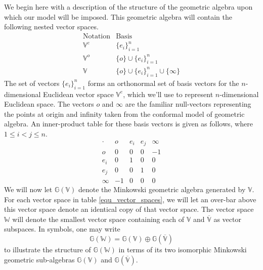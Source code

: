 \documentclass{birkjour}
\theoremstyle{definition}
\theoremstyle{remark}
\numberwithin{equation}{section}
\newcommand{\G}{\mathbb{G}}
\newcommand{\V}{\mathbb{V}}
\newcommand{\Vb}{\mathbb{\overline{V}}}
\newcommand{\W}{\mathbb{W}}
\newcommand{\nvao}{o}
\newcommand{\nvai}{\infty}
\begin{document}
We begin here with a description of the structure of the geometric algebra upon
which our model will be imposed.  This
geometric algebra will contain the following nested vector spaces.
\begin{equation}\label{equ_vector_spaces}
\begin{array}{ll}
\mbox{Notation} & \mbox{Basis} \\
\hline
\V^e & \{e_i\}_{i=1}^n \\
\V^o & \{\nvao\}\cup\{e_i\}_{i=1}^n \\
\V & \{\nvao\}\cup\{e_i\}_{i=1}^n\cup\{\nvai\}
\end{array}
\end{equation}
The set of vectors $\{e_i\}_{i=1}^n$ forms an orthonormal set of basis
vectors for the $n$-dimensional Euclidean vector space $\V^e$, which we'll
use to represent $n$-dimensional Euclidean space.
The vectors $\nvao$ and $\nvai$ are the familiar null-vectors representing the
points at origin and infinity taken from the conformal model of geometric algebra.
An inner-product table for these basis vectors is given as follows, where
$1\leq i<j\leq n$.
\begin{equation}
\begin{array}{c|cccc}
\cdot & \nvao & e_i & e_j & \nvai \\
\hline
\nvao & 0 & 0 & 0 & -1 \\
e_i & 0 & 1 & 0 & 0 \\
e_j & 0 & 0 & 1 & 0 \\
\nvai & -1 & 0 & 0 & 0
\end{array}
\end{equation}
We will now let $\G(\V)$ denote the Minkowski geometric algebra generated by $\V$.
For each vector space in table \eqref{equ_vector_spaces}, we will let an over-bar
above this vector space denote an identical copy of that vector space.  The vector
space $\W$ will denote the smallest vector space containing each of $\V$ and $\Vb$
as vector subspaces.  In symbols, one may write
\begin{equation}
\G(\W) = \G(\V)\oplus\G(\Vb)
\end{equation}
to illustrate the structure of $\G(\W)$ in terms of its two isomorphic Minkowski
geometric sub-algebras $\G(\V)$ and $\G(\Vb)$.
\end{document}
